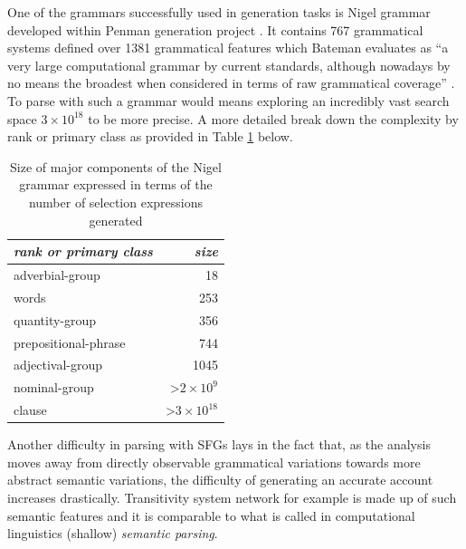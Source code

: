 One of the grammars successfully used in generation tasks is Nigel grammar developed within Penman generation project \citep{Mann83}. It contains 767 grammatical systems defined over 1381 grammatical features which Bateman evaluates as ``a very large computational grammar by current standards, although nowadays by no means the broadest when considered in terms of raw grammatical coverage'' \citep[29]{Bateman2008}. To parse with such a grammar would means exploring an incredibly vast search space $ 3 \times 10^{18} $ to be more precise. A more detailed break down the complexity by rank or primary class as provided in Table \ref{tab:size} below.

\begin{table}[!ht]
    \centering
    \begin{tabular}{|l|r|}
        \hline
        \textit{rank or primary class} & \textit{size}                             \\ \hline
        adverbial-group                & 18                                        \\ \hline
        words                          & 253                                       \\ \hline
        quantity-group                 & 356                                       \\ \hline
        prepositional-phrase           & 744                                       \\ \hline
        adjectival-group               & 1045                                      \\ \hline
        nominal-group                  & \textgreater $ 2\times 10^{9} $  \\ \hline
        clause                         & \textgreater $ 3\times 10^{18} $ \\ \hline
    \end{tabular}
    \caption{Size of major components of the Nigel grammar expressed in terms of the number of selection expressions generated \citep[35]{Bateman2008}}
    \label{tab:size}
\end{table}

Another difficulty in parsing with SFGs lays in the fact that, as the analysis moves away from directly observable grammatical variations towards more abstract semantic variations, the difficulty of generating an accurate account increases drastically. Transitivity system network for example is made up of such semantic features and it is comparable to what is called in computational linguistics (shallow) \textit{semantic parsing}.

